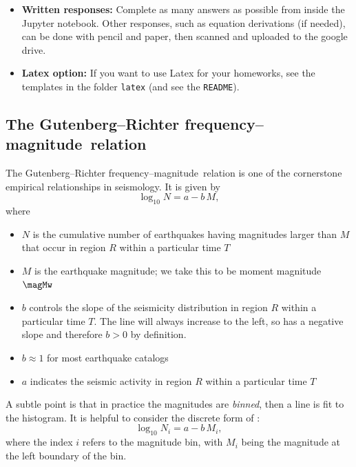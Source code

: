 \documentclass[11pt,titlepage,fleqn]{article}
\newcommand{\fmag}{frequency--magnitude}
\begin{document}
\begin{itemize}
\item {\bf Written responses:}
Complete as many answers as possible from inside the Jupyter notebook. Other responses, such as equation derivations (if needed), can be done with pencil and paper, then scanned and uploaded to the google drive.

\item {\bf Latex option:}
If you want to use Latex for your homeworks, see the templates in the folder \verb+latex+ (and see the \verb+README+).

\end{itemize}


\pagebreak
\subsection*{The Gutenberg--Richter \fmag\ relation}

The Gutenberg--Richter \fmag\ relation \citep{GutenbergRichter1944} is one of the cornerstone empirical relationships in seismology. It is given by
%
\begin{equation}
\log_{10} N = a - b\,M,
\label{GR}
\end{equation}
%
where
%
\begin{itemize}
\item $N$ is the cumulative number of earthquakes having magnitudes larger than $M$ that occur in region $R$ within a particular time $T$
\item $M$ is the earthquake magnitude; we take this to be moment magnitude $\magMw$
\item $b$ controls the slope of the seismicity distribution in region $R$ within a particular time $T$. The line will always increase to the left, so  has a negative slope and therefore $b > 0$ by definition.
\item $b \approx 1$ for most earthquake catalogs
\item $a$ indicates the seismic activity in region $R$ within a particular time $T$
\end{itemize}
%
A subtle point is that in practice the magnitudes are {\em binned}, then a line is fit to the histogram. It is helpful to consider the discrete form of :
%
\begin{equation}
\log_{10} N_i = a - b\,M_i,
\label{GRd}
\end{equation}
%
where the index $i$ refers to the magnitude bin, with $M_i$ being the magnitude at the left boundary of the bin.
\end{document}
